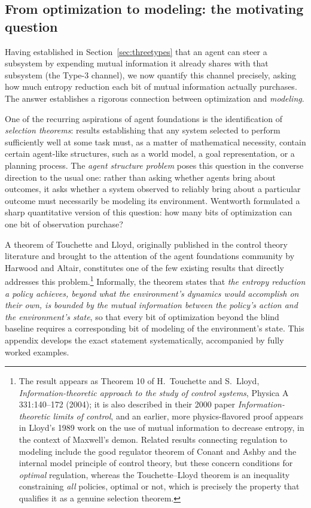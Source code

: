 \documentclass[11pt]{article}
\begin{document}
\subsection{From optimization to modeling: the motivating question}
\label{sec:tlquestion}

Having established in Section~\ref{sec:threetypes} that an agent can steer a subsystem by expending mutual information it already shares with that subsystem (the Type-3 channel), we now quantify this channel precisely, asking how much entropy reduction each bit of mutual information actually purchases. The answer establishes a rigorous connection between optimization and \emph{modeling}.

One of the recurring aspirations of agent foundations is the identification of \emph{selection theorems}: results establishing that any system selected to perform sufficiently well at some task must, as a matter of mathematical necessity, contain certain agent-like structures, such as a world model, a goal representation, or a planning process. The \emph{agent structure problem} poses this question in the converse direction to the usual one: rather than asking whether agents bring about outcomes, it asks whether a system observed to reliably bring about a particular outcome must necessarily be modeling its environment. Wentworth formulated a sharp quantitative version of this question: how many bits of optimization can one bit of observation purchase?

A theorem of Touchette and Lloyd, originally published in the control theory literature and brought to the attention of the agent foundations community by Harwood and Altair, constitutes one of the few existing results that directly addresses this problem.\footnote{The result appears as Theorem 10 of H.~Touchette and S.~Lloyd, \emph{Information-theoretic approach to the study of control systems}, Physica A 331:140--172 (2004); it is also described in their 2000 paper \emph{Information-theoretic limits of control}, and an earlier, more physics-flavored proof appears in Lloyd's 1989 work on the use of mutual information to decrease entropy, in the context of Maxwell's demon. Related results connecting regulation to modeling include the good regulator theorem of Conant and Ashby and the internal model principle of control theory, but these concern conditions for \emph{optimal} regulation, whereas the Touchette--Lloyd theorem is an inequality constraining \emph{all} policies, optimal or not, which is precisely the property that qualifies it as a genuine selection theorem.} Informally, the theorem states that \emph{the entropy reduction a policy achieves, beyond what the environment's dynamics would accomplish on their own, is bounded by the mutual information between the policy's action and the environment's state}, so that every bit of optimization beyond the blind baseline requires a corresponding bit of modeling of the environment's state. This appendix develops the exact statement systematically, accompanied by fully worked examples.
\end{document}
